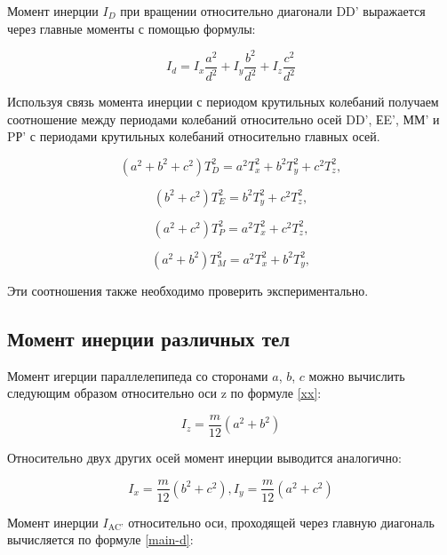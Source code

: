 \documentclass[a4paper, 12pt]{article}
\begin{document}
Момент инерции $I_{D}$ при вращении относительно диагонали DD' выражается
 через главные моменты с помощью формулы:
 
\begin{equation}\label{main-d}
    I_{d}=I_{x}\frac{a^2}{d^2}+I_{y}\frac{b^2}{d^2}+I_{z}\frac{c^2}{d^2}
\end{equation}

Используя связь момента инерции с периодом крутильных колебаний
получаем соотношение между периодами колебаний относительно осей DD', ЕE',
ММ' и PР' с периодами крутильных колебаний относительно главных осей.

\begin{equation}\label{verify1}
    (a^2+b^2+c^2)T^2_{D}=a^2 T^2_{x}+b^2 T^2_{y}+c^2 T^2_{z},
\end{equation}

\begin{equation}\label{verify2}
    (b^2+c^2)T^2_{E}=b^2 T^2_{y}+c^2 T^2_{z},
\end{equation}

\begin{equation}\label{verify3}
    (a^2+c^2)T^2_{P}=a^2 T^2_{x}+c^2 T^2_{z},
\end{equation}

\begin{equation}\label{verify4}
    (a^2+b^2)T^2_{M}=a^2 T^2_{x}+b^2 T^2_{y},
\end{equation}

Эти соотношения также необходимо проверить экспериментально.

\subsection{Момент инерции различных тел}

Момент игерции параллелепипеда со сторонами $a$, $b$, $c$ можно вычислить следующим образом относительно оси z по формуле \eqref{xx}:

\begin{equation}
    I_{z} = \frac{m}{12} (a^2 + b^2)
\end{equation}

Относительно двух других осей момент инерции выводится аналогично:

\begin{equation}\label{cilinder-xy}
    I_{x} = \frac{m}{12} (b^2 + c^2), I_{y} = \frac{m}{12} (a^2 + c^2)
\end{equation}

Момент инерции $I_\text{AC'}$ относительно оси, проходящей через главную диагональ вычисляется по формуле \eqref{main-d}:
\end{document}
